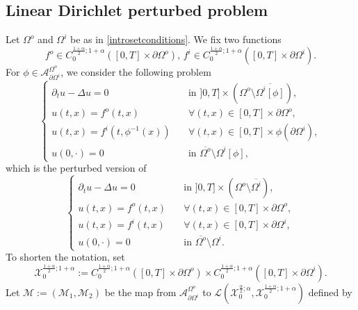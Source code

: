\documentclass[11pt,reqno,a4paper]{amsart}
\theoremstyle{plain}
\theoremstyle{definition}
\begin{document}
\subsection{Linear Dirichlet perturbed problem}
Let $\Omega^o$ and $\Omega^i$ be as in \eqref{introsetconditions}. We fix two functions
\begin{equation}\label{introfunconditions} 
f^o \in C_{0}^{\frac{1+\alpha}{2}; 1+\alpha}([0,T] \times \partial\Omega^o), \, f^i \in C_{0}^{\frac{1+\alpha}{2}; 1+\alpha}([0,T] \times \partial\Omega^i).
\end{equation}
For $\phi \in \mathcal{A}^{\Omega^o}_{\partial\Omega^i}$, we consider the following problem
\begin{equation}\label{princeqpertu}
\begin{cases}
    \partial_t u - \Delta u = 0 & \quad\text{in } ]0,T] \times (\Omega^o \setminus \overline{\Omega^i[\phi]}), 
    \\
    u(t,x) = f^o(t,x)& \quad \forall (t,x)\in [0,T] \times \partial \Omega^o, 
    \\
    u(t,x) = f^i(t,\phi^{-1}(x)) & \quad \forall (t,x)\in  [0,T] \times \phi(\partial\Omega^i),
    \\
    u(0,\cdot)=0 & \quad \text{in } \overline{\Omega^o} \setminus \Omega^i[\phi],
    \end{cases}
\end{equation}
which is the perturbed version of 
\begin{equation*}
    \begin{cases}
    \partial_t u - \Delta u = 0 & \quad\text{in } ]0,T] \times (\Omega^o \setminus \overline{\Omega^i}), 
    \\
    u (t,x) = f^o(t,x) & \quad \forall (t,x) \in [0,T] \times \partial \Omega^o,
    \\
    u (t,x) = f^i(t,x) & \quad \forall (t,x) \in [0,T] \times \partial \Omega^i,
    \\
    u (0,\cdot)=0 & \quad \text{in } \overline{\Omega^o} \setminus \Omega^i.
    \end{cases}
\end{equation*}
To shorten the notation, set
\[
\mathcal{X}_0^{\frac{1+\alpha}{2};1+\alpha}:= C_0^{\frac{1+\alpha}{2};1+\alpha}([0,T]\times\partial\Omega^o) \times C_0^{\frac{1+\alpha}{2};1+\alpha}([0,T]\times\partial\Omega^i).
\]
Let $\mathcal{M} := (\mathcal{M}_1,\mathcal{M}_2)$ be the map from $\mathcal{A}^{\Omega^o}_{\partial\Omega^i}$ to $\mathcal{L} \left(\mathcal{X}_0^{\frac{\alpha}{2}; \alpha}, \mathcal{X}_0^{\frac{1+\alpha}{2}; 1+\alpha} \right)$ defined by
\end{document}
